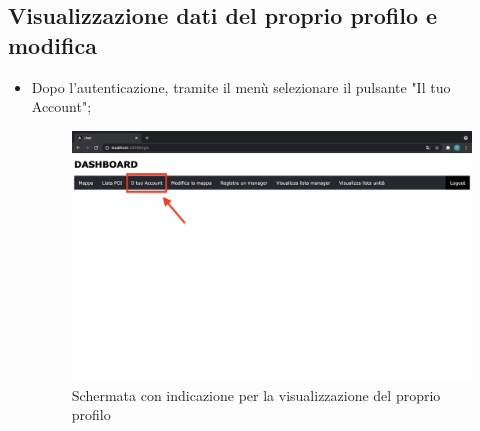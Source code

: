 \subsection{Visualizzazione dati del proprio profilo e modifica}
\begin{itemize}
    \item Dopo l'autenticazione, tramite il menù selezionare il pulsante "Il tuo Account";
    \begin{figure}[H]
        \centering
        \includegraphics[scale=0.12]{res/images/dashboard3.png}
        \caption{Schermata con indicazione per la visualizzazione del proprio profilo}
    \end{figure}
    

\end{itemize}

